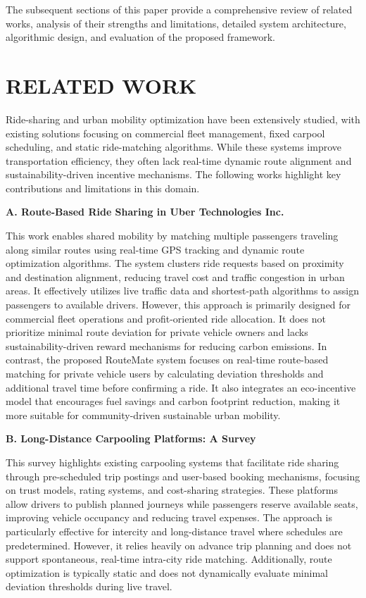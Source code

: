 \documentclass[conference]{IEEEtran}
\begin{document}
The subsequent sections of this paper provide a comprehensive review of related works, analysis of their strengths and limitations, detailed system architecture, algorithmic design, and evaluation of the proposed framework.

\section{RELATED WORK}

Ride-sharing and urban mobility optimization have been extensively studied, with existing solutions focusing on commercial fleet management, fixed carpool scheduling, and static ride-matching algorithms. While these systems improve transportation efficiency, they often lack real-time dynamic route alignment and sustainability-driven incentive mechanisms. The following works highlight key contributions and limitations in this domain.

\textbf{A. Route-Based Ride Sharing in Uber Technologies Inc.}

\vspace{2pt}
This work enables shared mobility by matching multiple passengers traveling along similar routes using real-time GPS tracking and dynamic route optimization algorithms. The system clusters ride requests based on proximity and destination alignment, reducing travel cost and traffic congestion in urban areas. It effectively utilizes live traffic data and shortest-path algorithms to assign passengers to available drivers. However, this approach is primarily designed for commercial fleet operations and profit-oriented ride allocation. It does not prioritize minimal route deviation for private vehicle owners and lacks sustainability-driven reward mechanisms for reducing carbon emissions. In contrast, the proposed RouteMate system focuses on real-time route-based matching for private vehicle users by calculating deviation thresholds and additional travel time before confirming a ride. It also integrates an eco-incentive model that encourages fuel savings and carbon footprint reduction, making it more suitable for community-driven sustainable urban mobility.

\vspace{4pt}
\textbf{B. Long-Distance Carpooling Platforms: A Survey}

\vspace{2pt}
This survey highlights existing carpooling systems that facilitate ride sharing through pre-scheduled trip postings and user-based booking mechanisms, focusing on trust models, rating systems, and cost-sharing strategies. These platforms allow drivers to publish planned journeys while passengers reserve available seats, improving vehicle occupancy and reducing travel expenses. The approach is particularly effective for intercity and long-distance travel where schedules are predetermined. However, it relies heavily on advance trip planning and does not support spontaneous, real-time intra-city ride matching. Additionally, route optimization is typically static and does not dynamically evaluate minimal deviation thresholds during live travel.
\end{document}
